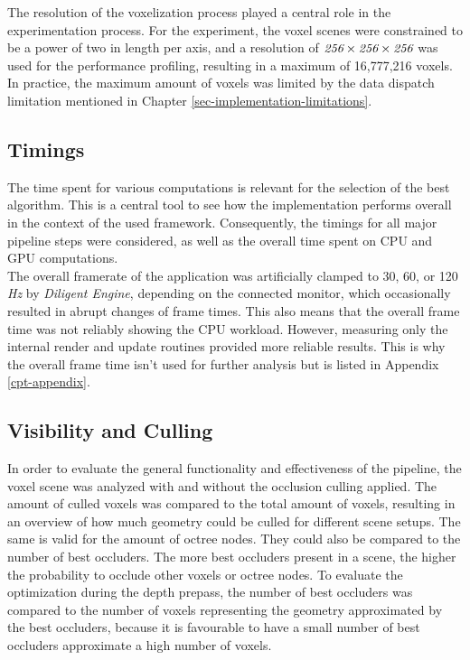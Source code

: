 \noindent
The resolution of the voxelization process played a central role in the experimentation process.
For the experiment, the voxel scenes were constrained to be a power of two in length per axis, and a resolution 
of $\emph{256} \times \emph{256} \times \emph{256}$ was used for the performance profiling, resulting in a maximum 
of 16,777,216 voxels. In practice, the maximum amount of voxels was limited by the data dispatch limitation mentioned 
in Chapter \ref{sec-implementation-limitations}.


\subsection*{Timings} \label{subsec-timings}

The time spent for various computations is relevant for the selection of the best algorithm. This is a central 
tool to see how the implementation performs overall in the context of the used framework. Consequently, the 
timings for all major pipeline steps were considered, as well as the overall time spent on \ac{CPU} and \ac{GPU} 
computations. \\

\noindent 
The overall framerate of the application was artificially clamped to 30, 60, or 120 \emph{Hz} by \emph{Diligent Engine}, 
depending on the connected monitor, which occasionally resulted in abrupt changes of frame times. This also means 
that the overall frame time was not reliably showing the \ac{CPU} workload. However, measuring only the internal render 
and update routines provided more reliable results. This is why the overall frame time isn't used for further analysis 
but is listed in Appendix \ref{cpt-appendix}.


\subsection*{Visibility and Culling} \label{subsec-visibility-and-culling}

In order to evaluate the general functionality and effectiveness of the pipeline, the voxel scene was analyzed 
with and without the occlusion culling applied. The amount of culled voxels was compared to the total amount of 
voxels, resulting in an overview of how much geometry could be culled for different scene setups. The same is 
valid for the amount of octree nodes. They could also be compared to the number of best occluders. The more best 
occluders present in a scene, the higher the probability to occlude other voxels or octree nodes. To evaluate 
the optimization during the depth prepass, the number of best occluders was compared to the number of voxels 
representing the geometry approximated by the best occluders, because it is favourable to have a small number of 
best occluders approximate a high number of voxels.\\


